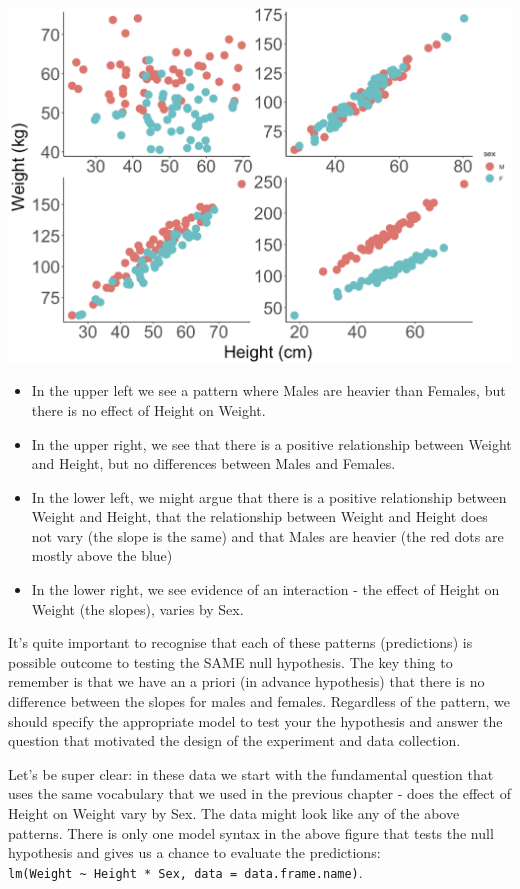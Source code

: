 \documentclass[
]{book}
\providecommand{\tightlist}{%
  \setlength{\itemsep}{0pt}\setlength{\parskip}{0pt}}
\begin{document}
\includegraphics[width=17.89in]{images/ANCOVA_1}

\begin{itemize}
\tightlist
\item
  In the upper left we see a pattern where Males are heavier than Females, but there is no effect of Height on Weight.
\item
  In the upper right, we see that there is a positive relationship between Weight and Height, but no differences between Males and Females.
\item
  In the lower left, we might argue that there is a positive relationship between Weight and Height, that the relationship between Weight and Height does not vary (the slope is the same) and that Males are heavier (the red dots are mostly above the blue)
\item
  In the lower right, we see evidence of an interaction - the effect of Height on Weight (the slopes), varies by Sex.
\end{itemize}

It's quite important to recognise that each of these patterns (predictions) is possible outcome to testing the SAME null hypothesis. The key thing to remember is that we have an a priori (in advance hypothesis) that there is no difference between the slopes for males and females. Regardless of the pattern, we should specify the appropriate model to test your the hypothesis and answer the question that motivated the design of the experiment and data collection.

Let's be super clear: in these data we start with the fundamental question that uses the same vocabulary that we used in the previous chapter - does the effect of Height on Weight vary by Sex. The data might look like any of the above patterns. There is only one model syntax in the above figure that tests the null hypothesis and gives us a chance to evaluate the predictions: \texttt{lm(Weight\ \textasciitilde{}\ Height\ *\ Sex,\ data\ =\ data.frame.name)}.
\end{document}
